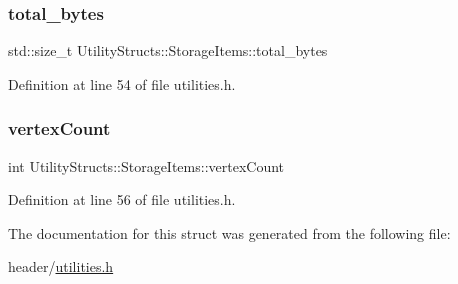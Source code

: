 \subsubsection{\texorpdfstring{total\+\_\+bytes}{total\_bytes}}
{\footnotesize\ttfamily std\+::size\+\_\+t Utility\+Structs\+::\+Storage\+Items\+::total\+\_\+bytes}



Definition at line 54 of file utilities.\+h.

\mbox{\label{struct_utility_structs_1_1_storage_items_af72522be713f23fcfe3ac66780183fda}} 
\subsubsection{\texorpdfstring{vertex\+Count}{vertexCount}}
{\footnotesize\ttfamily int Utility\+Structs\+::\+Storage\+Items\+::vertex\+Count}



Definition at line 56 of file utilities.\+h.



The documentation for this struct was generated from the following file\+:\begin{DoxyCompactItemize}
\item 
header/\hyperlink{utilities_8h}{utilities.\+h}\end{DoxyCompactItemize}
